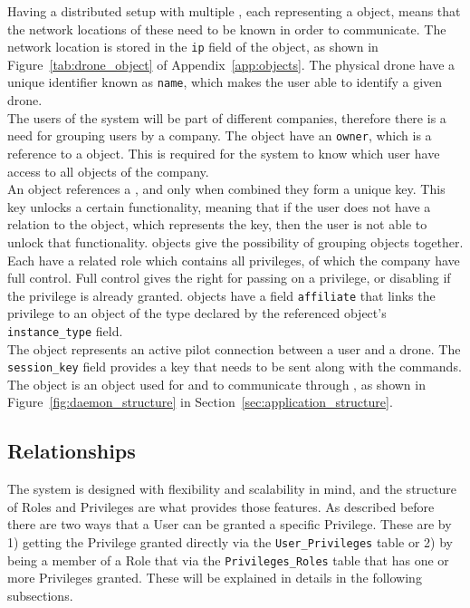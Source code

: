 Having a distributed setup with multiple , each representing a  object, means that the network locations of these need to be known in order to communicate.
The network location is stored in the \verb+ip+ field of the  object, as shown in Figure~\ref{tab:drone_object} of Appendix~\ref{app:objects}.
The physical drone have a unique identifier known as \verb+name+, which makes the user able to identify a given drone. \\

The users of the system will be part of different companies, therefore there is a need for grouping users by a company.
The  object have an \verb+owner+, which is a reference to a  object.
This is required for the system to know which user have access to all  objects of the company. \\

An  object references a , and only when combined they form a unique key.
This key unlocks a certain functionality, meaning that if the user does not have a relation to the  object, which represents the key, then the user is not able to unlock that functionality.
 objects give the possibility of grouping  objects together.
Each  have a related role which contains all privileges, of which the company have full control.
Full control gives the right for passing on a privilege, or disabling if the privilege is already granted.
 objects have a field \verb+affiliate+ that links the privilege to an object of the type declared by the referenced  object's \verb+instance_type+ field. \\

The  object represents an active pilot connection between a user and a drone.
The \verb+session_key+ field provides a key that needs to be sent along with the commands.
The  object is an object used for  and  to communicate through , as shown in Figure~\ref{fig:daemon_structure} in Section~\ref{sec:application_structure}.


\subsection{Relationships}
The system is designed with flexibility and scalability in mind, and the structure of Roles and Privileges are what provides those features.
As described before there are two ways that a User can be granted a specific Privilege.
These are by 1) getting the Privilege granted directly via the \verb+User_Privileges+ table or 2) by being a member of a Role that via the \verb+Privileges_Roles+ table that has one or more Privileges granted.
These will be explained in details in the following subsections.


